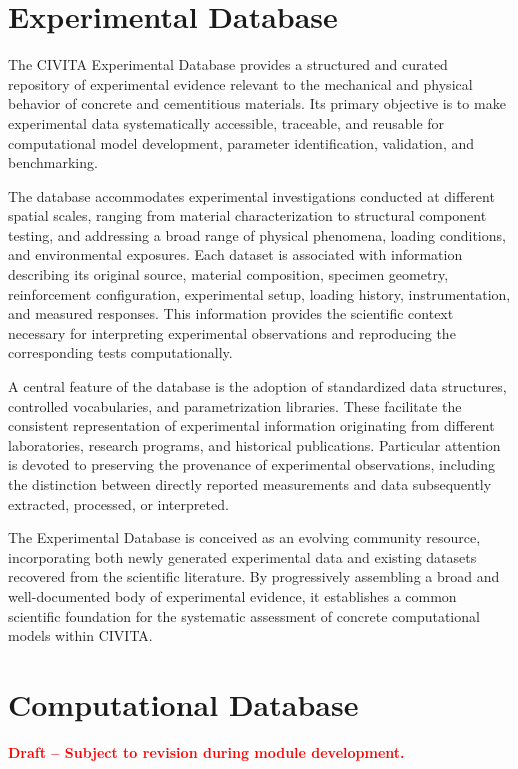 \section{Experimental Database}

The CIVITA Experimental Database provides a structured and curated repository of experimental evidence relevant to the mechanical and physical behavior of concrete and cementitious materials. Its primary objective is to make experimental data systematically accessible, traceable, and reusable for computational model development, parameter identification, validation, and benchmarking.

The database accommodates experimental investigations conducted at different spatial scales, ranging from material characterization to structural component testing, and addressing a broad range of physical phenomena, loading conditions, and environmental exposures. Each dataset is associated with information describing its original source, material composition, specimen geometry, reinforcement configuration, experimental setup, loading history, instrumentation, and measured responses. This information provides the scientific context necessary for interpreting experimental observations and reproducing the corresponding tests computationally.

A central feature of the database is the adoption of standardized data structures, controlled vocabularies, and parametrization libraries. These facilitate the consistent representation of experimental information originating from different laboratories, research programs, and historical publications. Particular attention is devoted to preserving the provenance of experimental observations, including the distinction between directly reported measurements and data subsequently extracted, processed, or interpreted.

The Experimental Database is conceived as an evolving community resource, incorporating both newly generated experimental data and existing datasets recovered from the scientific literature. By progressively assembling a broad and well-documented body of experimental evidence, it establishes a common scientific foundation for the systematic assessment of concrete computational models within CIVITA.


\section{Computational Database}

\noindent\textcolor{red}{\textbf{Draft -- Subject to revision during module development.}}

